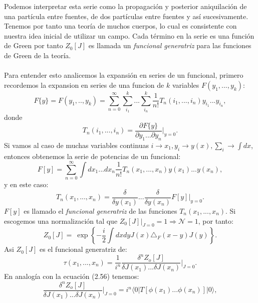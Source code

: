 Podemos interpretar esta serie como la propagación y posterior aniquilación de  una partícula entre fuentes, de dos partículas entre fuentes y así sucesivamente. Tenemos por tanto una teoría de muchos cuerpos, lo cual es consistente con nuestra idea inicial de utilizar un campo. Cada término en la serie es una función de Green por tanto $Z_0[J]$ es llamada un \textit{funcional generatriz} para las funciones de Green de la teoría.
\\
\\
Para entender esto analicemos la expansión en series de un funcional, primero recordemos la expansion en series de una funcion de $k$ variables $F(y_1,...,y_k)$:
\begin{equation}
F\{y\}=F(y_{1},..,y_{k})=\sum_{n=0}^{\infty}\sum_{i_{1}}^{k}...\sum_{i_{n}}^{k}\frac{1}{n!}T_{n}(i_{1},...,i_{n})y_{i_{1}}...y_{i_{n}},
\end{equation}
donde
\begin{equation}
T_{n}(i_{1},...,i_{n})=\frac{\partial F\{y\}}{\partial y_{1}...\partial y_{n}}\bigg|_{y=0} .
\end{equation}
Si vamos al caso de muchas variables continuas $i\rightarrow x_1, y_i\rightarrow y(x),\sum_i\rightarrow \int dx$, entonces obtenemos la serie de potencias de un funcional:
\begin{equation}
F[y]=\sum_{n=0}^{\infty}\int dx_{1}...dx_{n}\frac{1}{n!}T_{n}(x_{1},...,x_{n})y(x_{1})...y(x_{n}),
\end{equation}
y en este caso:
\begin{equation}
T_{n}(x_{1},...,x_{n})=\frac{\delta}{\delta y(x_{1})}...\frac{\delta}{\delta y(x_{n})}F[y]\bigg|_{y=0} .
\end{equation}
$F[y]$ es llamado el \textit{funcional generatriz} de las funciones  $T_{n}(x_{1},...,x_{n})$. Si escogemos una normalización tal que $Z_0[J]\bigg|_{J=0}=1 \Rightarrow \mathcal{N}=1$, por tanto:
\begin{equation}
Z_{0}[J]=\ \exp\left\{ -\frac{i}{2}\int dxdyJ(x)\triangle_{F}(x-y)J(y)\right\} .
\end{equation}
Asi $Z_0[J]$ es el funcional generatriz de:
\begin{equation}
\tau(x_{1},...,x_{n})=\frac{1}{i^{n}}\frac{\delta^{n}Z_{o}[J]}{\delta J(x_{1})...\delta J(x_{n})}\bigg|_{J=0}.
\end{equation}
En analogía con la ecuación (2.56) tenemos:
\begin{equation}
\frac{\delta^{n}Z_{o}[J]}{\delta J(x_{1})...\delta J(x_{n})}\bigg|_{J=0}=i^{n}\langle0|T[\phi(x_{1})...\phi(x_{n})]|0\rangle ,
\end{equation}
